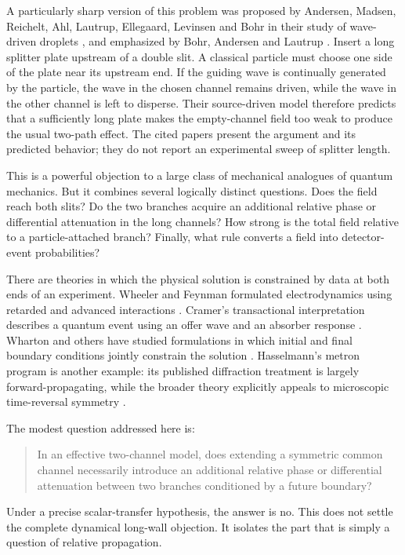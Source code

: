 \documentclass[11pt]{article}
\begin{document}
A particularly sharp version of this problem was proposed by Andersen, Madsen, Reichelt, Ahl, Lautrup, Ellegaard, Levinsen and Bohr in their study of wave-driven droplets \cite{Andersen2015}, and emphasized by Bohr, Andersen and Lautrup \cite{Bohr2016}.  Insert a long splitter plate upstream of a double slit.  A classical particle must choose one side of the plate near its upstream end.  If the guiding wave is continually generated by the particle, the wave in the chosen channel remains driven, while the wave in the other channel is left to disperse.  Their source-driven model therefore predicts that a sufficiently long plate makes the empty-channel field too weak to produce the usual two-path effect.  The cited papers present the argument and its predicted behavior; they do not report an experimental sweep of splitter length.

This is a powerful objection to a large class of mechanical analogues of quantum mechanics.  But it combines several logically distinct questions.  Does the field reach both slits?  Do the two branches acquire an additional relative phase or differential attenuation in the long channels?  How strong is the total field relative to a particle-attached branch?  Finally, what rule converts a field into detector-event probabilities?

There are theories in which the physical solution is constrained by data at both ends of an experiment.  Wheeler and Feynman formulated electrodynamics using retarded and advanced interactions \cite{WheelerFeynman1945,WheelerFeynman1949}.  Cramer's transactional interpretation describes a quantum event using an offer wave and an absorber response \cite{Cramer1986}.  Wharton and others have studied formulations in which initial and final boundary conditions jointly constrain the solution \cite{Wharton2007}.  Hasselmann's metron program is another example: its published diffraction treatment is largely forward-propagating, while the broader theory explicitly appeals to microscopic time-reversal symmetry \cite{Hasselmann1997,Hasselmann1998,Hasselmann2004}.

The modest question addressed here is:

\begin{quote}
In an effective two-channel model, does extending a symmetric common channel necessarily introduce an additional relative phase or differential attenuation between two branches conditioned by a future boundary?
\end{quote}

Under a precise scalar-transfer hypothesis, the answer is no.  This does not settle the complete dynamical long-wall objection.  It isolates the part that is simply a question of relative propagation.
\end{document}
